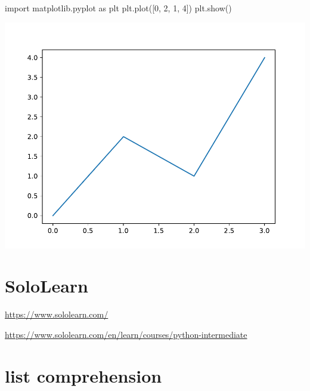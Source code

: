 \documentclass[
]{book}
\newenvironment{Shaded}{\begin{snugshade}}{\end{snugshade}}
\newcommand{\CommentTok}[1]{\textcolor[rgb]{0.56,0.35,0.01}{\textit{#1}}}
\newcommand{\DecValTok}[1]{\textcolor[rgb]{0.00,0.00,0.81}{#1}}
\newcommand{\ImportTok}[1]{#1}
\newcommand{\NormalTok}[1]{#1}
\theoremstyle{definition}
\theoremstyle{definition}
\theoremstyle{definition}
\theoremstyle{definition}
\theoremstyle{remark}
\begin{document}
\begin{Shaded}
\end{Shaded}

\begin{Shaded}
\begin{Highlighting}[]
\ImportTok{import}\NormalTok{ matplotlib.pyplot }\ImportTok{as}\NormalTok{ plt}
\NormalTok{plt.plot([}\DecValTok{0}\NormalTok{, }\DecValTok{2}\NormalTok{, }\DecValTok{1}\NormalTok{, }\DecValTok{4}\NormalTok{])}
\NormalTok{plt.show()}
\end{Highlighting}
\end{Shaded}

\includegraphics{202401292317-Python_files/figure-latex/unnamed-chunk-9-1.pdf}

\hypertarget{sololearn}{%
\section{SoloLearn}\label{sololearn}}

\url{https://www.sololearn.com/}

\url{https://www.sololearn.com/en/learn/courses/python-intermediate}

\hypertarget{list-comprehension}{%
\section{list comprehension}\label{list-comprehension}}
\end{document}
